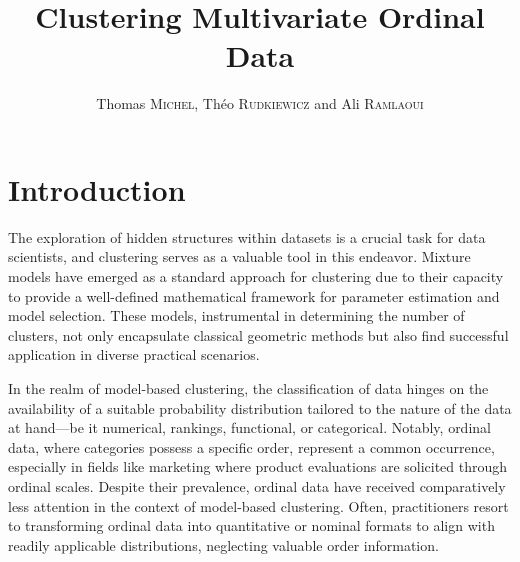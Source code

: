 \documentclass[a4paper,12pt]{article}
\title{Clustering Multivariate Ordinal Data}
\author{Thomas \textsc{Michel}, Théo \textsc{Rudkiewicz} and Ali \textsc{Ramlaoui}}
\begin{document}
\maketitle



\section{Introduction}
The exploration of hidden structures within datasets is a crucial task for data scientists, and clustering serves as a valuable tool in this endeavor. Mixture models have emerged as a standard approach for clustering due to their capacity to provide a well-defined mathematical framework for parameter estimation and model selection. These models, instrumental in determining the number of clusters, not only encapsulate classical geometric methods but also find successful application in diverse practical scenarios.

In the realm of model-based clustering, the classification of data hinges on the availability of a suitable probability distribution tailored to the nature of the data at hand—be it numerical, rankings, functional, or categorical. Notably, ordinal data, where categories possess a specific order, represent a common occurrence, especially in fields like marketing where product evaluations are solicited through ordinal scales. Despite their prevalence, ordinal data have received comparatively less attention in the context of model-based clustering. Often, practitioners resort to transforming ordinal data into quantitative or nominal formats to align with readily applicable distributions, neglecting valuable order information.
\end{document}
